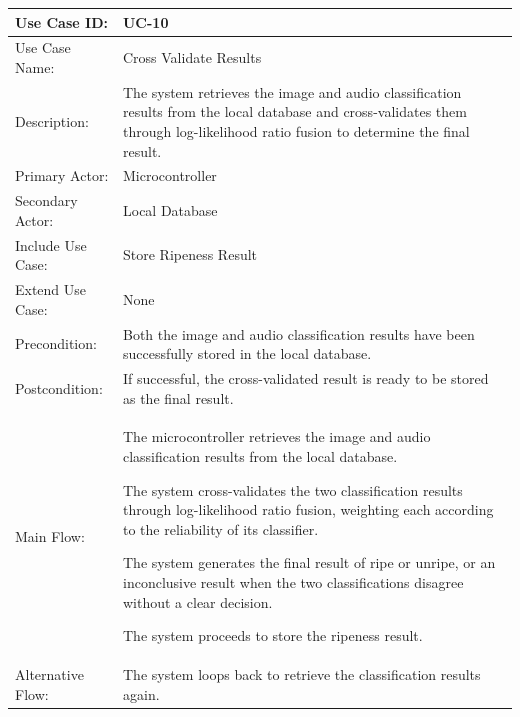\begin{thesisprose}
\FloatBarrier
\begingroup
\small
\setlength{\tabcolsep}{3pt}
\renewcommand{\arraystretch}{1.14}
\setlength{\arrayrulewidth}{0.625pt}
\def\LTcaptype{uncaptionedgrid}
\begin{longtable}{|>{\raggedright\arraybackslash}p{}|>{\raggedright\arraybackslash}p{}|}
\hline
Use Case ID: & UC-10 \\
\hline
Use Case Name: & Cross Validate Results \\
\hline
Description: & The system retrieves the image and audio classification results from the local database and cross-validates them through log-likelihood ratio fusion to determine the final result. \\
\hline
Primary Actor: & Microcontroller \\
\hline
Secondary Actor: & Local Database \\
\hline
Include Use Case: & Store Ripeness Result \\
\hline
Extend Use Case: & None \\
\hline
Precondition: & Both the image and audio classification results have been successfully stored in the local database. \\
\hline
Postcondition: & If successful, the cross-validated result is ready to be stored as the final result. \\
\hline
Main Flow: & The microcontroller retrieves the image and audio classification results from the local database.\par The system cross-validates the two classification results through log-likelihood ratio fusion, weighting each according to the reliability of its classifier.\par The system generates the final result of ripe or unripe, or an inconclusive result when the two classifications disagree without a clear decision.\par The system proceeds to store the ripeness result. \\
\hline
Alternative Flow: & The system loops back to retrieve the classification results again. \\
\hline
\end{longtable}
\endgroup


\end{thesisprose}
